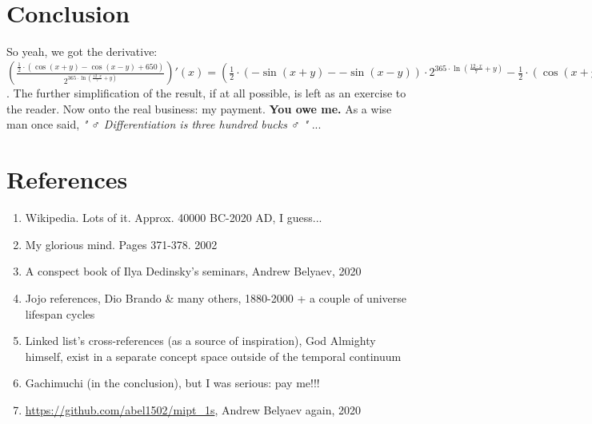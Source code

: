 \documentclass[12pt]{article}
\begin{document}
\begin{fleqn}[\parindent]
\section{\Large{Conclusion}}
So yeah, we got the derivative: 
$ (\frac{\frac{ 1 }{ 2 } \cdot (\cos ( x  +  y ) - \cos ( x  -  y ) +  650 )}{{ 2 }^{ 365  \cdot \ln (\frac{ 12  \cdot  x }{ 7 } +  y )}})'(x) = (\frac{ 1 }{ 2 } \cdot (- \sin ( x  +  y ) - - \sin ( x  -  y )) \cdot { 2 }^{ 365  \cdot \ln (\frac{ 12  \cdot  x }{ 7 } +  y )} - \frac{ 1 }{ 2 } \cdot (\cos ( x  +  y ) - \cos ( x  -  y ) +  650 ) \cdot \ln  2  \cdot { 2 }^{ 365  \cdot \ln (\frac{ 12  \cdot  x }{ 7 } +  y )} \cdot  365  \cdot \frac{\frac{ 84 }{ 49 }}{\frac{ 12  \cdot  x }{ 7 } +  y }) \div {({ 2 }^{ 365  \cdot \ln (\frac{ 12  \cdot  x }{ 7 } +  y )})}^{ 2 } $. 
The further simplification of the result, if at all possible, is left as an exercise to the reader.
Now onto the real business: my payment. \textbf{You owe me.}
As a wise man once said, \textit{" ♂ Differentiation is three hundred bucks ♂ "} ...
\section{\Large{References}}
\begin{enumerate}
\item Wikipedia. Lots of it. Approx. 40000 BC-2020 AD, I guess...
\item My glorious mind. Pages 371-378. 2002
\item A conspect book of Ilya Dedinsky's seminars, Andrew Belyaev, 2020
\item Jojo references, Dio Brando \& many others, 1880-2000 + a couple of universe lifespan cycles
\item Linked list's cross-references (as a source of inspiration), God Almighty himself, exist in a separate concept space outside of the temporal continuum
\item Gachimuchi (in the conclusion), but I was serious: pay me!!!
\item \url{https://github.com/abel1502/mipt_1s}, Andrew Belyaev again, 2020\end{enumerate}
\end{fleqn}
\end{document}
